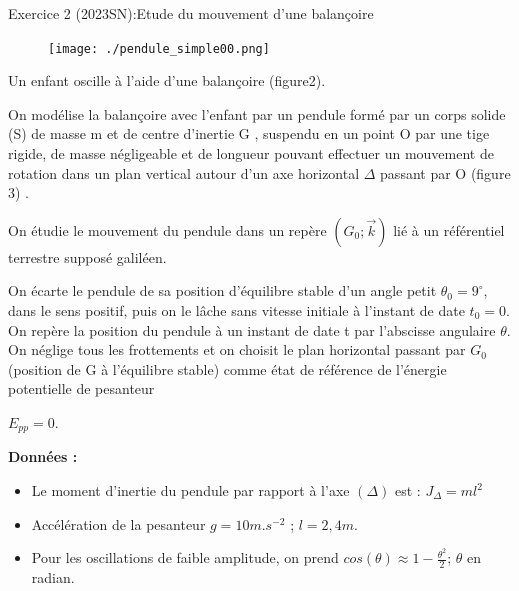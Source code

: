 \documentclass[12pt, french]{article}
\begin{document}
\begin{Box2}{Exercice 2 (2023SN):Etude du mouvement d’une balançoire }
   \begin{figure}
  \begin{center}
	  \vspace{-0.6cm}
	\texttt{[image: ./pendule\_simple00.png]}
  \end{center}
\end{figure}
Un enfant oscille à l’aide d’une balançoire (figure2).

  On modélise la balançoire avec l’enfant par un pendule formé par un corps solide (S) de
masse m et de centre d’inertie G , suspendu en un point O par une tige rigide, de masse
négligeable et de longueur pouvant effectuer un mouvement de rotation dans un plan
vertical autour d’un axe horizontal $\Delta$
passant par O (figure 3) . 

  On étudie le mouvement du pendule dans un repère $(G_0 ;\vec{k})$
lié à un référentiel terrestre supposé galiléen.

On écarte le pendule de sa position d’équilibre stable d’un angle petit $\theta_0 = 9^{\circ}$, dans le
sens positif, puis on le lâche sans vitesse initiale à l’instant de date $t_0 = 0$.
On repère la position du pendule à un instant de date t par l’abscisse angulaire $\theta$.
On néglige tous les frottements et on choisit le plan horizontal passant par
$G_0$ (position de G à l’équilibre stable) comme état de référence de l’énergie potentielle de pesanteur 

  $E_{pp} = 0$.



\textbf{Données : }
\begin{itemize}
  \item Le moment d’inertie du pendule par rapport à l’axe $(\Delta)$ est : $J_{\Delta} = ml^2$
  \item Accélération de la pesanteur $g = 10 m.s^{-2}$ ; $l = 2,4m$.
  \item Pour les oscillations de faible amplitude, on prend $cos(\theta) \approx 1 - \frac{\theta^2}{2} $; $\theta$ en radian.
\end{itemize}


\end{Box2}
\end{document}
